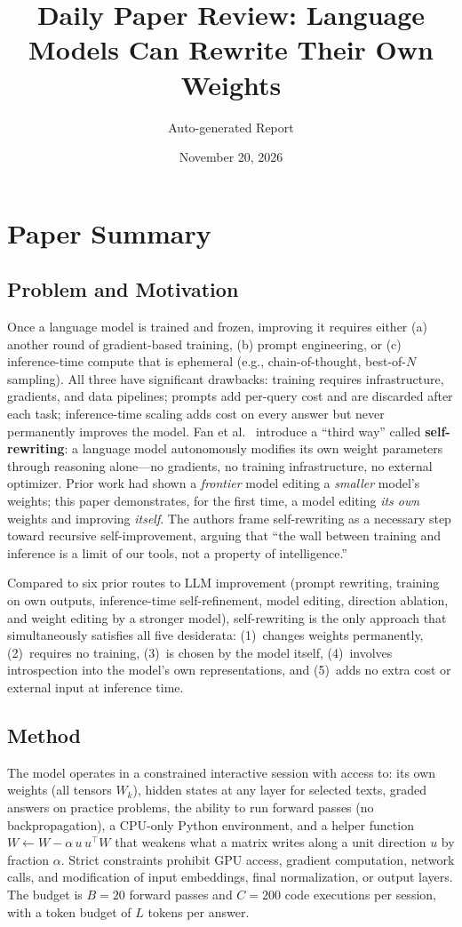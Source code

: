 \documentclass[11pt,a4paper]{article}
\title{Daily Paper Review: Language Models Can Rewrite Their Own Weights}
\author{Auto-generated Report}
\date{November 20, 2026}
\begin{document}
\maketitle

\section{Paper Summary}

\subsection{Problem and Motivation}
Once a language model is trained and frozen, improving it requires either (a) another round of gradient-based training, (b) prompt engineering, or (c) inference-time compute that is ephemeral (e.g., chain-of-thought, best-of-$N$ sampling). All three have significant drawbacks: training requires infrastructure, gradients, and data pipelines; prompts add per-query cost and are discarded after each task; inference-time scaling adds cost on every answer but never permanently improves the model. Fan et al.~\cite{fan2026rewrite} introduce a ``third way'' called \textbf{self-rewriting}: a language model autonomously modifies its own weight parameters through reasoning alone---no gradients, no training infrastructure, no external optimizer. Prior work had shown a \emph{frontier} model editing a \emph{smaller} model's weights; this paper demonstrates, for the first time, a model editing \emph{its own} weights and improving \emph{itself}. The authors frame self-rewriting as a necessary step toward recursive self-improvement, arguing that ``the wall between training and inference is a limit of our tools, not a property of intelligence.''

Compared to six prior routes to LLM improvement (prompt rewriting, training on own outputs, inference-time self-refinement, model editing, direction ablation, and weight editing by a stronger model), self-rewriting is the only approach that simultaneously satisfies all five desiderata: (1)~changes weights permanently, (2)~requires no training, (3)~is chosen by the model itself, (4)~involves introspection into the model's own representations, and (5)~adds no extra cost or external input at inference time.

\subsection{Method}
The model operates in a constrained interactive session with access to: its own weights (all tensors $W_k$), hidden states at any layer for selected texts, graded answers on practice problems, the ability to run forward passes (no backpropagation), a CPU-only Python environment, and a helper function $W \leftarrow W - \alpha\, u\, u^\top W$ that weakens what a matrix writes along a unit direction $u$ by fraction $\alpha$. Strict constraints prohibit GPU access, gradient computation, network calls, and modification of input embeddings, final normalization, or output layers. The budget is $B{=}20$ forward passes and $C{=}200$ code executions per session, with a token budget of $L$ tokens per answer.
\end{document}
